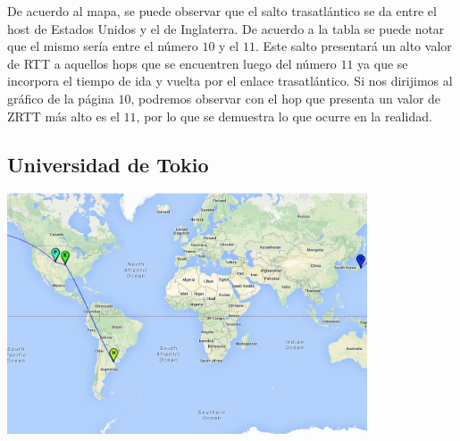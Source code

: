 De acuerdo al mapa, se puede observar que el salto trasatlántico se da entre el host de Estados Unidos y el de Inglaterra. De acuerdo a la tabla se puede notar que el mismo sería entre el número $10$ y el $11$. Este salto presentará un alto valor de RTT a aquellos hops que se encuentren luego del número $11$ ya que se incorpora el tiempo de ida y vuelta por el enlace trasatlántico. Si nos dirijimos al gráfico de la página $10$, podremos observar con el hop que presenta un valor de ZRTT más alto es el $11$, por lo que se demuestra lo que ocurre en la realidad.    

\subsection{Universidad de Tokio}
\centerline{\includegraphics[width=0.8\textwidth]{mapas/Japon.png}}

